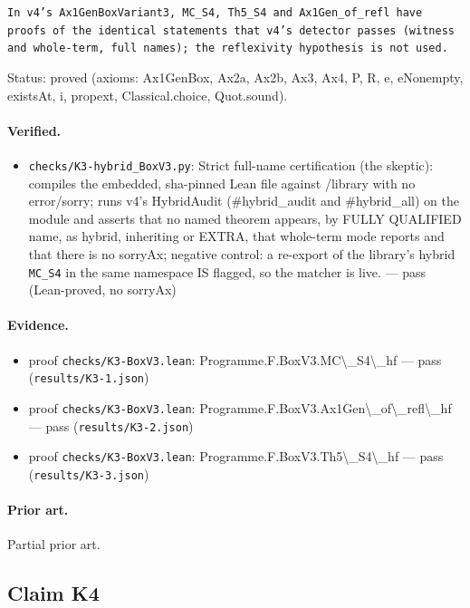 \documentclass{article}
\begin{document}
\texttt{In v4's Ax1GenBoxVariant3, MC\_S4, Th5\_S4 and Ax1Gen\_of\_refl have proofs of the identical statements that v4's detector passes (witness and whole-term, full names); the reflexivity hypothesis is not used.}

Status: proved (axioms: Ax1GenBox, Ax2a, Ax2b, Ax3, Ax4, P, R, e, eNonempty, existsAt, i, propext, Classical.choice, Quot.sound).

\paragraph{Verified.}
\begin{itemize}
\item \texttt{checks/K3-hybrid\_BoxV3.py}: Strict full-name certification (the skeptic): compiles the embedded, sha-pinned Lean file against /library with no error/sorry; runs v4's HybridAudit (\#hybrid\_audit and \#hybrid\_all) on the module and asserts that no named theorem appears, by FULLY QUALIFIED name, as hybrid, inheriting or EXTRA, that whole-term mode reports and that there is no sorryAx; negative control: a re-export of the library's hybrid \texttt{MC\_S4} in the same namespace IS flagged, so the matcher is live. --- pass (Lean-proved, no sorryAx)
\end{itemize}

\paragraph{Evidence.}
\begin{itemize}
\item proof \texttt{checks/K3-BoxV3.lean}: Programme.F.BoxV3.MC\textbackslash{}\_S4\textbackslash{}\_hf --- pass (\texttt{results/K3-1.json})
\item proof \texttt{checks/K3-BoxV3.lean}: Programme.F.BoxV3.Ax1Gen\textbackslash{}\_of\textbackslash{}\_refl\textbackslash{}\_hf --- pass (\texttt{results/K3-2.json})
\item proof \texttt{checks/K3-BoxV3.lean}: Programme.F.BoxV3.Th5\textbackslash{}\_S4\textbackslash{}\_hf --- pass (\texttt{results/K3-3.json})
\end{itemize}

\paragraph{Prior art.} Partial prior art.

\subsection*{Claim K4}
\end{document}
